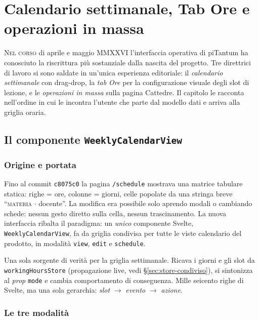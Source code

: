 \chapter{Calendario settimanale, Tab Ore e operazioni in massa}
\label{ch:calendario-ore}

\lettrine[lines=3]{N}{el corso} di aprile e maggio MMXXVI l'interfaccia
operativa di piTantum ha conosciuto la riscrittura pi\`u sostanziale
dalla nascita del progetto. Tre direttrici di lavoro si sono saldate
in un'unica esperienza editoriale: il \emph{calendario settimanale}
con drag-drop, la \emph{tab Ore} per la configurazione visuale degli
slot di lezione, e le \emph{operazioni in massa} sulla pagina Cattedre.
Il capitolo le racconta nell'ordine in cui le incontra l'utente che
parte dal modello dati e arriva alla griglia oraria.

\section{Il componente \texttt{WeeklyCalendarView}}
\label{sec:weekly-calendar}

\subsection{Origine e portata}

Fino al commit \texttt{c8075c0} la pagina \texttt{/schedule}
mostrava una matrice tabulare statica: righe = ore, colonne =
giorni, celle popolate da una stringa breve ``\textsc{materia}
$\cdot$ docente''. La modifica era possibile solo aprendo modali
o cambiando schede: nessun gesto diretto sulla cella, nessun
trascinamento. La nuova interfaccia ribalta il paradigma: un
\emph{unico} componente Svelte, \texttt{WeeklyCalendarView}, fa da
griglia condivisa per tutte le viste calendario del prodotto, in
modalit\`a \texttt{view}, \texttt{edit} e \texttt{schedule}.

\begin{defbox}[title={Il file \texttt{WeeklyCalendarView.svelte}}]
Una sola sorgente di verit\`a per la griglia settimanale.
Ricava i giorni e gli slot da \texttt{workingHoursStore}
(propagazione live, vedi \S\ref{sec:store-condiviso}), si
sintonizza al \emph{prop} \texttt{mode} e cambia comportamento
di conseguenza. Mille seicento righe di Svelte, ma una sola
gerarchia: \emph{slot} ${\rightarrow}$ \emph{evento} ${\rightarrow}$
\emph{azione}.
\end{defbox}

\subsection{Le tre modalit\`a}

